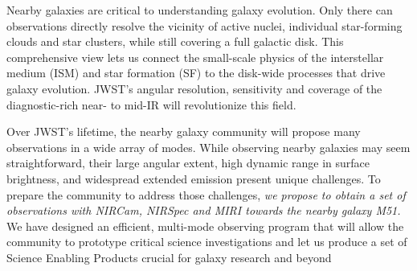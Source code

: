 \documentclass[12pt]{article}
\begin{document}
%
%
\rationaletime          %

\vspace{-0.1in}
Nearby galaxies are critical to understanding galaxy evolution. Only there can observations directly resolve the vicinity of active nuclei, individual star-forming clouds and star clusters, while still covering a full galactic disk. This comprehensive view lets us connect the small-scale physics of the interstellar medium (ISM) and star formation (SF) to the disk-wide processes that drive galaxy evolution. JWST's angular resolution, sensitivity and coverage of the diagnostic-rich near- to mid-IR will revolutionize this field.


Over JWST's lifetime, the nearby galaxy community will propose many observations in a wide array of modes. While observing nearby galaxies may seem straightforward, their large angular extent, high dynamic range in surface brightness, and widespread extended emission present unique challenges. To prepare the community to address those challenges, {\em we propose to obtain a set of observations with NIRCam, NIRSpec and MIRI towards the nearby galaxy M51.} We have designed an efficient, multi-mode observing program that will allow the community to prototype critical science investigations and let us produce a set of Science Enabling Products crucial for galaxy research and beyond
\end{document}
